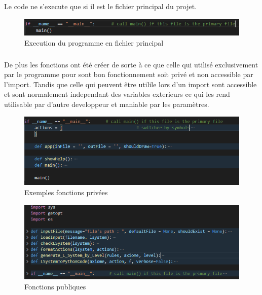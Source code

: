 \documentclass{report}
\begin{document}
			\subparagraph{}
				Le code ne s'execute que si il est le fichier principal du projet.

				\begin{figure}[h]
					\begin{center}
						\includegraphics[scale=0.75]{images/modulePrimaryFile.PNG}
						\caption{Execution du programme en fichier principal}
					\end{center}
				\end{figure}

			\subparagraph{}
				De plus les fonctions ont été créer de sorte à ce que celle qui utilisé exclusivement par le programme pour sont bon fonctionnement soit privé et non accessible par l'import. Tandis que celle qui peuvent être utilile lors d'un import sont accessible et sont normalement independant des variables exterieurs ce qui les rend utilisable par d'autre developpeur et maniable par les paramètres.

				\begin{figure}[h]
					\begin{center}
						\includegraphics[scale=0.75]{images/privatefunctions.PNG}
						\caption{Exemples fonctions privées}
					\end{center}
				\end{figure}

				\begin{figure}[h]
					\begin{center}
						\includegraphics[scale=0.75]{images/fonctionpubliques.PNG}
						\caption{Fonctions publiques}
					\end{center}
				\end{figure}
\end{document}
